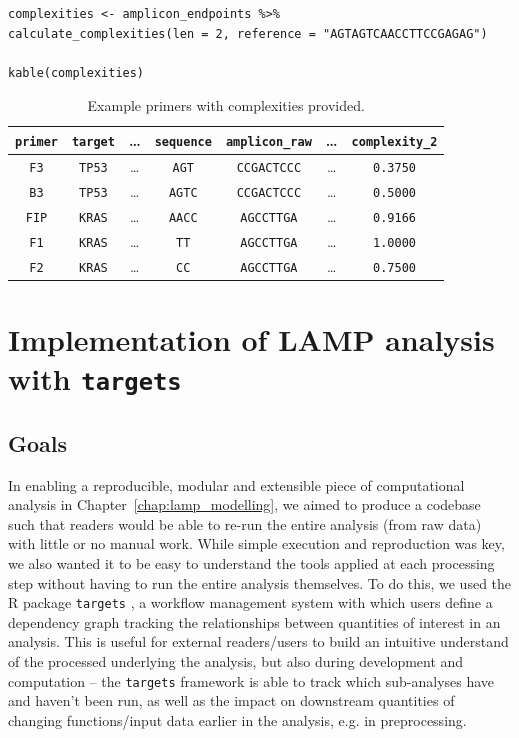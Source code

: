 \documentclass[../thesis.tex]{subfiles}
\begin{document}
\begin{lstlisting}
complexities <- amplicon_endpoints %>%
calculate_complexities(len = 2, reference = "AGTAGTCAACCTTCCGAGAG")

kable(complexities)
\end{lstlisting}

\begin{table}[h!]
    \centering
    \begin{tabular}{c|c|c|c|c|c|c}
         \verb|primer| & \verb|target|    & \dots & \verb|sequence| & \verb|amplicon_raw| & \dots & \verb|complexity_2| \\
         \hline
\verb|F3| &	\verb|TP53|	& 	\dots	& \verb|AGT|  &	\verb|CCGACTCCC|	& \dots  &	\verb|0.3750| \\
\verb|B3| &	\verb|TP53| & \dots  &	\verb|AGTC|	& \verb|CCGACTCCC| & \dots &	\verb|0.5000| \\
\verb|FIP| &	\verb|KRAS|  &	\dots	& \verb|AACC|  &	\verb|AGCCTTGA|	& \dots &	\verb|0.9166|\\
\verb|F1| &	\verb|KRAS| & \dots  &	\verb|TT|	& \verb|AGCCTTGA| & \dots  &	\verb|1.0000| \\
\verb|F2| &	\verb|KRAS|  &	\dots	& \verb|CC|  &	\verb|AGCCTTGA|& \dots  &	\verb|0.7500|	\\

    \end{tabular}
    \caption{Example primers with complexities provided.}
    \label{tab:complexities}
\end{table}



\section{Implementation of LAMP analysis with \texttt{targets} \label{sec:lamp_targets}}

\subsection{Goals}

In enabling a reproducible, modular and extensible piece of computational analysis in Chapter~\ref{chap:lamp_modelling}, we aimed to produce a codebase such that readers would be able to re-run the entire analysis (from raw data) with little or no manual work. While simple execution and reproduction was key, we also wanted it to be easy to understand the tools applied at each processing step without having to run the entire analysis themselves. To do this, we used the R package \texttt{targets} \citep{landau_targets_2023}, a workflow management system with which users define a dependency graph tracking the relationships between quantities of interest in an analysis. This is useful for external readers/users to build an intuitive understand of the processed underlying the analysis, but also during development and computation -- the \texttt{targets} framework is able to track which sub-analyses have and haven't been run, as well as the impact on downstream quantities of changing functions/input data earlier in the analysis, e.g. in preprocessing.
\end{document}
